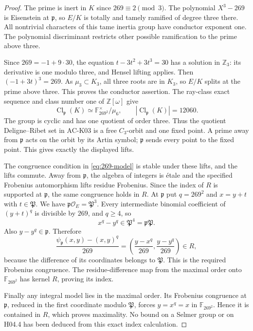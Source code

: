 \begin{proof}
The prime is inert in $K$ since $269\equiv2\pmod3$.
The polynomial $X^3-269$ is Eisenstein at $\mathfrak p$, so
$E/K$ is totally and tamely ramified of degree three there.
All nontrivial characters of this tame inertia group have
conductor exponent one. The polynomial discriminant restricts
other possible ramification to the prime above three.

Since $269=-1+9\cdot30$, the equation
$t-3t^2+3t^3=30$ has a solution in $\mathbb Z_3$:
its derivative is one modulo three, and Hensel lifting applies.
Then $(-1+3t)^3=269$. As $\mu_3\subset K_3$, all three roots
are in $K_3$, so $E/K$ splits at the prime above three.
This proves the conductor assertion. The ray-class exact
sequence and class number one of $\mathbb Z[\omega]$ give
\[
 \operatorname{Cl}_{\mathfrak p}(K)
   \simeq\mathbb F_{269^2}^{\times}/\mu_6,
       \qquad |\operatorname{Cl}_{\mathfrak p}(K)|=12060.
\]
The group is cyclic and has one quotient of order three. Thus
the quotient Deligne--Ribet set in AC-K03 is a free $C_3$-orbit
and one fixed point. A prime away from $\mathfrak p$ acts on
the orbit by its Artin symbol; $\mathfrak p$ sends every point
to the fixed point. This gives exactly the displayed lifts.

The congruence condition in \eqref{eq:269-model} is stable under
these lifts, and the lifts commute. Away from $\mathfrak p$,
the algebra of integers is \'etale and the specified Frobenius
automorphism lifts residue Frobenius. Since the index of $R$
is supported at $\mathfrak p$, the same congruence holds in $R$.
At $\mathfrak p$ put $q=269^2$ and $x=y+t$ with
$t\in\mathfrak P$. We have $\mathfrak p\mathcal O_E=\mathfrak P^3$.
Every intermediate binomial coefficient of $(y+t)^q$ is
divisible by $269$, and $q\ge4$, so
\[
                 x^q-y^q\in\mathfrak P^4
                                      =\mathfrak p\mathfrak P.
\]
Also $y-y^q\in\mathfrak p$. Therefore
\[
 \frac{\psi_{\mathfrak p}(x,y)-(x,y)^q}{269}
 =\left(\frac{y-x^q}{269},\frac{y-y^q}{269}\right)\in R,
\]
because the difference of its coordinates belongs to
$\mathfrak P$. This is the required Frobenius congruence.
The residue-difference map from the maximal order onto
$\mathbb F_{269^2}$ has kernel $R$, proving its index.

Finally any integral model lies in the maximal order. Its
Frobenius congruence at $\mathfrak p$, reduced in the first
coordinate modulo $\mathfrak P$, forces $y=x^q=x$ in
$\mathbb F_{269^2}$. Hence it is contained in $R$, which proves
maximality. No bound on a Selmer group or on H04.4 has been
deduced from this exact index calculation.
\end{proof}

